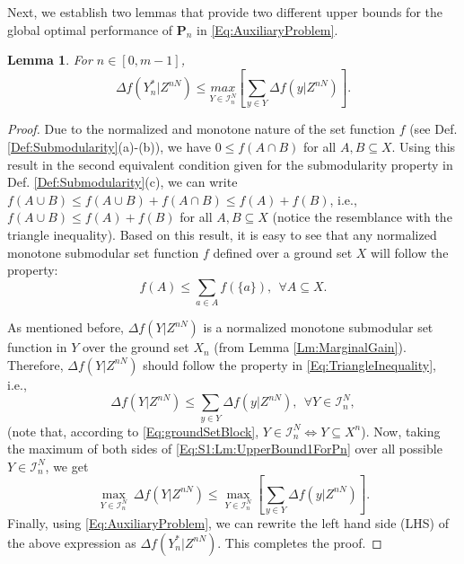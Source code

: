 \documentclass[conference]{IEEEtran}
\newtheorem{lemma}{Lemma}
\begin{document}

Next, we establish two lemmas that provide two different upper bounds for the global optimal performance of $\mathbf{P}_n$ in \eqref{Eq:AuxiliaryProblem}.
\begin{lemma}\label{Lm:UpperBound1ForPn} 
For $n\in[0,m-1]$,
\begin{equation}\label{Eq:Lm:UpperBound1ForPn}
\Delta f(Y^*_n\vert Z^{nN}) \leq  \underset{Y\in\mathcal{I}^N_n}{max} \left[ \sum_{y\in Y} \Delta f(y\vert Z^{nN}) \right].
\end{equation}
\end{lemma}

\begin{proof}
Due to the normalized and monotone nature of the set function $f$ (see Def. \ref{Def:Submodularity}(a)-(b)), we have $0 \leq f(A \cap B)$ for all $A,B \subseteq X$. Using this result in the second equivalent condition given for the submodularity property in Def. \ref{Def:Submodularity}(c), we can write $f(A \cup B) \leq f(A \cup B) + f(A \cap B) \leq f(A) + f(B)$, i.e., $f(A \cup B) \leq f(A) + f(B)$ for all $A,B\subseteq X$ (notice the resemblance with the triangle inequality). Based on this result, it is easy to see that any normalized monotone submodular set function $f$ defined over a ground set $X$ will follow the property: 
\begin{equation}\label{Eq:TriangleInequality}
    f(A)\leq \sum_{a \in A} f(\{a\}), \ \ \forall A \subseteq X.
\end{equation}

As mentioned before, $\Delta f(Y \vert Z^{nN})$ is a normalized monotone submodular set function in $Y$ over the ground set $X_n$ (from Lemma \ref{Lm:MarginalGain}). Therefore, $\Delta f(Y \vert Z^{nN})$ should follow the property in \eqref{Eq:TriangleInequality}, i.e., 
\begin{equation}\label{Eq:S1:Lm:UpperBound1ForPn}
    \Delta f(Y \vert Z^{nN}) \leq \sum_{y \in Y} \Delta f(y\vert Z^{nN}),\ \ \forall Y \in \mathcal{I}^N_n, 
\end{equation}
(note that, according to \eqref{Eq:groundSetBlock}, $Y \in \mathcal{I}^N_n \iff Y \subseteq X^n$). Now, taking the maximum of both sides of \eqref{Eq:S1:Lm:UpperBound1ForPn} over all possible $Y \in \mathcal{I}^N_n$, we get 
\begin{equation}
    \underset{Y\in\mathcal{I}^N_n}{\max}\ \Delta f(Y \vert Z^{nN}) \leq \underset{Y\in\mathcal{I}^N_n}{\max} \left[\sum_{y \in Y} \Delta f(y\vert Z^{nN})\right].
\end{equation}
Finally, using \eqref{Eq:AuxiliaryProblem}, we can rewrite the left hand side (LHS) of the above expression as $\Delta f(Y^*_n\vert Z^{nN})$. This completes the proof. \end{proof}
\end{document}
